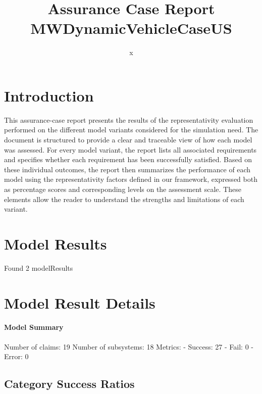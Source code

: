 \documentclass{article}
\title{Assurance Case Report MWDynamicVehicleCaseUS}
\author{x}
\begin{document}
	\maketitle
	\section{Introduction}
	This assurance-case report presents the results of the 
	representativity evaluation performed on the different model variants considered for 
	the simulation need. The document is structured to provide a clear and traceable view of how 
	each model was assessed. For every model variant, the report lists all associated requirements
	 and specifies whether each requirement has been successfully satisfied. Based on these 
	individual outcomes, the report then summarizes the performance of each model using the 
	representativity factors defined in our framework, expressed both as percentage scores 
	and corresponding levels on the assessment scale. These elements allow the reader to understand 
	the strengths and limitations of each variant.
	 
	\section{Model Results}
    Found 2 modelResults
		
			\section{Model Result Details} 
			\paragraph{Model Summary}
			Number of claims: 19
			Number of subsystems: 18
			Metrics:
			- Success: 27
			- Fail: 0
			- Error: 0
			
	

					\subsection{Category Success Ratios}
						
\end{document}
